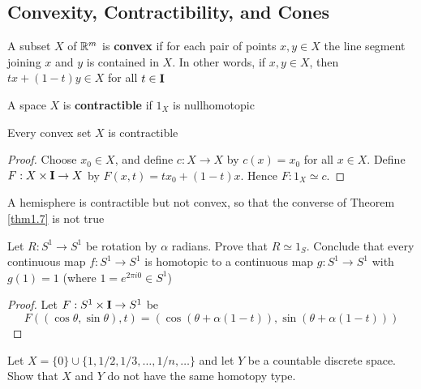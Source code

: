 \documentclass[11pt]{article}
\begin{document}
\subsection{Convexity, Contractibility, and Cones}
\label{sec:org4479158}
\begin{definition}[]
A subset \(X\) of \(\mathbb{R}^m\) is \textbf{convex} if for each pair of points \(x,y\in X\) the line segment
joining \(x\) and \(y\) is contained in \(X\). In other words, if \(x,y\in X\),
then \(tx+(1-t)y\in X\) for all \(t\in\operatorname{\textbf{I}}\)
\end{definition}

\begin{definition}[]
A space \(X\) is \textbf{contractible} if \(1_X\) is nullhomotopic
\end{definition}

\begin{theorem}[]
\label{thm1.7}
Every convex set \(X\) is contractible
\end{theorem}

\begin{proof}
Choose \(x_0\in X\), and define \(c:X\to X\) by \(c(x)=x_0\) for all \(x\in X\). Define \(F:X\times\operatorname{\textbf{I}}\to X\)
by \(F(x,t)=tx_0+(1-t)x\). Hence \(F:1_X\simeq c\).
\end{proof}

A hemisphere is contractible but not convex, so that the converse of Theorem \ref{thm1.7} is not
true

\begin{exercise}
\label{ex1.3}
Let \(R:S^1\to S^1\) be rotation by \(\alpha\) radians. Prove that \(R\simeq 1_S\). Conclude that every continuous
map \(f:S^1\to S^1\) is homotopic to a continuous map \(g:S^1\to S^1\) with \(g(1)=1\)
(where \(1=e^{2\pi i0}\in S^1\))
\end{exercise}

\begin{proof}
Let \(F:S^1\times\operatorname{\textbf{I}}\to S^1\) be
\begin{equation*}
F((\cos\theta,\sin\theta),t)=(\cos(\theta+\alpha(1-t)),\sin(\theta+\alpha(1-t)))
\end{equation*}
\end{proof}

\begin{exercise}
\label{ex1.5}
\label{Problem2}
Let \(X=\{0\}\cup\{1,1/2,1/3,\dots,1/n,\dots\}\) and let \(Y\) be a countable discrete space. Show that \(X\)
and \(Y\) do not have the same homotopy type.
\end{exercise}
\end{document}

